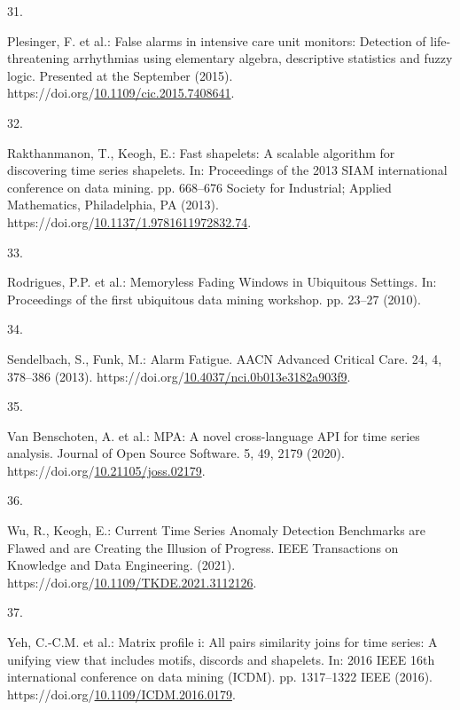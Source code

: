 \documentclass[runningheads]{llncs}
\newlength{\cslhangindent}
\newlength{\csllabelwidth}
\newenvironment{CSLReferences}[2] %
 {%
  \setlength{\parindent}{0pt}
  \ifodd #1 \everypar{\setlength{\hangindent}{\cslhangindent}}\ignorespaces\fi
  \ifnum #2 > 0
  \setlength{\parskip}{#2\baselineskip}
  \fi
 }%
 {}
\newcommand{\CSLLeftMargin}[1]{\parbox[t]{\csllabelwidth}{#1}}
\newcommand{\CSLRightInline}[1]{\parbox[t]{\linewidth - \csllabelwidth}{#1}\break}
\begin{document}
\begin{CSLReferences}{0}{0}
\leavevmode{}%
\CSLLeftMargin{31. }
\CSLRightInline{Plesinger, F. et al.: False alarms in intensive care unit monitors: Detection of life-threatening arrhythmias using elementary algebra, descriptive statistics and fuzzy logic. Presented at the September (2015). https://doi.org/\href{https://doi.org/10.1109/cic.2015.7408641}{10.1109/cic.2015.7408641}.}

\leavevmode{}%
\CSLLeftMargin{32. }
\CSLRightInline{Rakthanmanon, T., Keogh, E.: Fast shapelets: A scalable algorithm for discovering time series shapelets. In: Proceedings of the 2013 SIAM international conference on data mining. pp. 668--676 Society for Industrial; Applied Mathematics, Philadelphia, PA (2013). https://doi.org/\href{https://doi.org/10.1137/1.9781611972832.74}{10.1137/1.9781611972832.74}.}

\leavevmode{}%
\CSLLeftMargin{33. }
\CSLRightInline{Rodrigues, P.P. et al.: {Memoryless Fading Windows in Ubiquitous Settings}. In: Proceedings of the first ubiquitous data mining workshop. pp. 23--27 (2010).}

\leavevmode{}%
\CSLLeftMargin{34. }
\CSLRightInline{Sendelbach, S., Funk, M.: Alarm Fatigue. AACN Advanced Critical Care. 24, 4, 378--386 (2013). https://doi.org/\href{https://doi.org/10.4037/nci.0b013e3182a903f9}{10.4037/nci.0b013e3182a903f9}.}

\leavevmode{}%
\CSLLeftMargin{35. }
\CSLRightInline{Van Benschoten, A. et al.: MPA: A novel cross-language API for time series analysis. Journal of Open Source Software. 5, 49, 2179 (2020). https://doi.org/\href{https://doi.org/10.21105/joss.02179}{10.21105/joss.02179}.}

\leavevmode{}%
\CSLLeftMargin{36. }
\CSLRightInline{Wu, R., Keogh, E.: {Current Time Series Anomaly Detection Benchmarks are Flawed and are Creating the Illusion of Progress}. IEEE Transactions on Knowledge and Data Engineering. (2021). https://doi.org/\href{https://doi.org/10.1109/TKDE.2021.3112126}{10.1109/TKDE.2021.3112126}.}

\leavevmode{}%
\CSLLeftMargin{37. }
\CSLRightInline{Yeh, C.-C.M. et al.: Matrix profile i: All pairs similarity joins for time series: A unifying view that includes motifs, discords and shapelets. In: 2016 IEEE 16th international conference on data mining (ICDM). pp. 1317--1322 IEEE (2016). https://doi.org/\href{https://doi.org/10.1109/ICDM.2016.0179}{10.1109/ICDM.2016.0179}.}

\end{CSLReferences}
\end{document}
